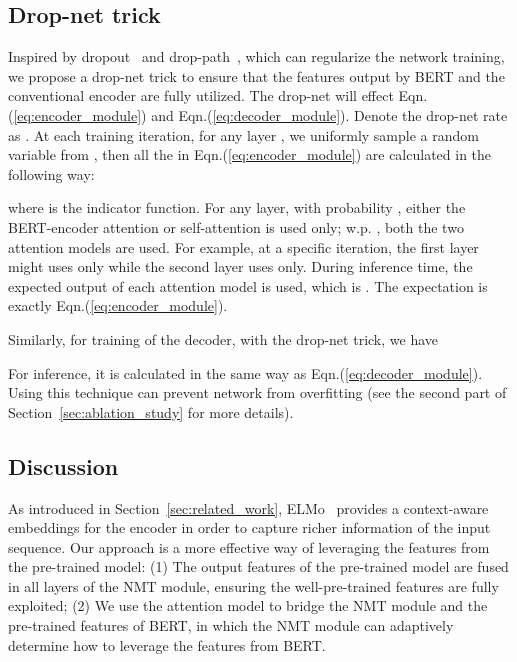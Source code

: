 \documentclass{article} \usepackage{iclr2020_conference,times}
\newcommand{\myeqref}[1]{Eqn.(\ref{#1})}
\begin{document}
\subsection{Drop-net trick}
Inspired by dropout~\citep{srivastava2014dropout} and drop-path~\citep{larsson2017fractalnet}, which can regularize the network training, we propose a drop-net trick to ensure that the features output by BERT and the conventional encoder are fully utilized. The drop-net will effect \myeqref{eq:encoder_module} and \myeqref{eq:decoder_module}. Denote the drop-net rate as . At each training iteration, for any layer , we uniformly sample a random variable  from , then all the  in \myeqref{eq:encoder_module} are calculated in the following way:
\begin{small}

\end{small}
where  is the indicator function. For any layer, with probability , either the BERT-encoder attention or self-attention is used only; w.p. , both the two attention models are used. For example, at a specific iteration, the first layer might uses  only while the second layer uses  only. During inference time, the expected output of each attention model is used, which is . The expectation is exactly \myeqref{eq:encoder_module}.

Similarly, for training of the decoder, with the drop-net trick, we have 
\begin{small}

\end{small}
For inference, it is calculated in the same way as \myeqref{eq:decoder_module}. Using this technique can prevent network from overfitting (see the second part of Section~\ref{sec:ablation_study} for more details).

\subsection{Discussion}


 As introduced in Section~\ref{sec:related_work}, ELMo~\citep{peters2018deep} provides a context-aware embeddings for the encoder in order to capture richer information of the input sequence. Our approach is a more effective way of leveraging the features from the pre-trained model: (1) The output features of the pre-trained model are fused in all layers of the NMT module, ensuring the well-pre-trained features are fully exploited; (2) We use the attention model to bridge the NMT module and the pre-trained features of BERT, in which the NMT module can adaptively determine how to leverage the features from BERT.
\end{document}

